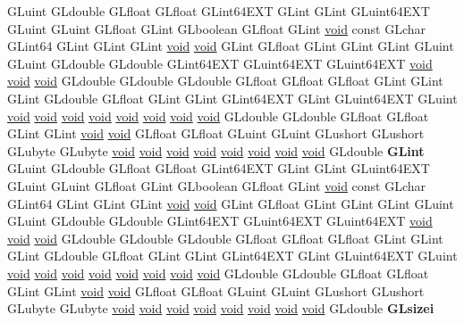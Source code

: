 \begin{DoxyCompactItemize}
\begin{tabbing}
\>GLuint GLdouble GLfloat GLfloat GLint64EXT GLint GLint GLuint64EXT GLuint GLuint GLfloat GLint GLboolean GLfloat GLint \hyperlink{interfacevoid}{void} const GLchar GLint64 GLint GLint GLint \hyperlink{interfacevoid}{void} \hyperlink{interfacevoid}{void} GLint GLfloat GLint GLint GLint GLuint GLuint GLdouble GLdouble GLint64EXT GLuint64EXT GLuint64EXT \hyperlink{interfacevoid}{void} \hyperlink{interfacevoid}{void} \hyperlink{interfacevoid}{void} GLdouble GLdouble GLdouble GLfloat GLfloat GLfloat GLint GLint GLint GLdouble GLfloat GLint GLint GLint64EXT GLint GLuint64EXT GLuint \hyperlink{interfacevoid}{void} \hyperlink{interfacevoid}{void} \hyperlink{interfacevoid}{void} \hyperlink{interfacevoid}{void} \hyperlink{interfacevoid}{void} \hyperlink{interfacevoid}{void} \hyperlink{interfacevoid}{void} \hyperlink{interfacevoid}{void} GLdouble GLdouble GLfloat GLfloat GLint GLint \hyperlink{interfacevoid}{void} \hyperlink{interfacevoid}{void} GLfloat GLfloat GLuint GLuint GLushort GLushort GLubyte GLubyte \hyperlink{interfacevoid}{void} \hyperlink{interfacevoid}{void} \hyperlink{interfacevoid}{void} \hyperlink{interfacevoid}{void} \hyperlink{interfacevoid}{void} \hyperlink{interfacevoid}{void} \hyperlink{interfacevoid}{void} \hyperlink{interfacevoid}{void} GLdouble {\bfseries GLint}\\
\>GLuint GLdouble GLfloat GLfloat GLint64EXT GLint GLint GLuint64EXT GLuint GLuint GLfloat GLint GLboolean GLfloat GLint \hyperlink{interfacevoid}{void} const GLchar GLint64 GLint GLint GLint \hyperlink{interfacevoid}{void} \hyperlink{interfacevoid}{void} GLint GLfloat GLint GLint GLint GLuint GLuint GLdouble GLdouble GLint64EXT GLuint64EXT GLuint64EXT \hyperlink{interfacevoid}{void} \hyperlink{interfacevoid}{void} \hyperlink{interfacevoid}{void} GLdouble GLdouble GLdouble GLfloat GLfloat GLfloat GLint GLint GLint GLdouble GLfloat GLint GLint GLint64EXT GLint GLuint64EXT GLuint \hyperlink{interfacevoid}{void} \hyperlink{interfacevoid}{void} \hyperlink{interfacevoid}{void} \hyperlink{interfacevoid}{void} \hyperlink{interfacevoid}{void} \hyperlink{interfacevoid}{void} \hyperlink{interfacevoid}{void} \hyperlink{interfacevoid}{void} GLdouble GLdouble GLfloat GLfloat GLint GLint \hyperlink{interfacevoid}{void} \hyperlink{interfacevoid}{void} GLfloat GLfloat GLuint GLuint GLushort GLushort GLubyte GLubyte \hyperlink{interfacevoid}{void} \hyperlink{interfacevoid}{void} \hyperlink{interfacevoid}{void} \hyperlink{interfacevoid}{void} \hyperlink{interfacevoid}{void} \hyperlink{interfacevoid}{void} \hyperlink{interfacevoid}{void} \hyperlink{interfacevoid}{void} GLdouble {\bfseries GLsizei}\\

\end{tabbing}
\end{DoxyCompactItemize}
